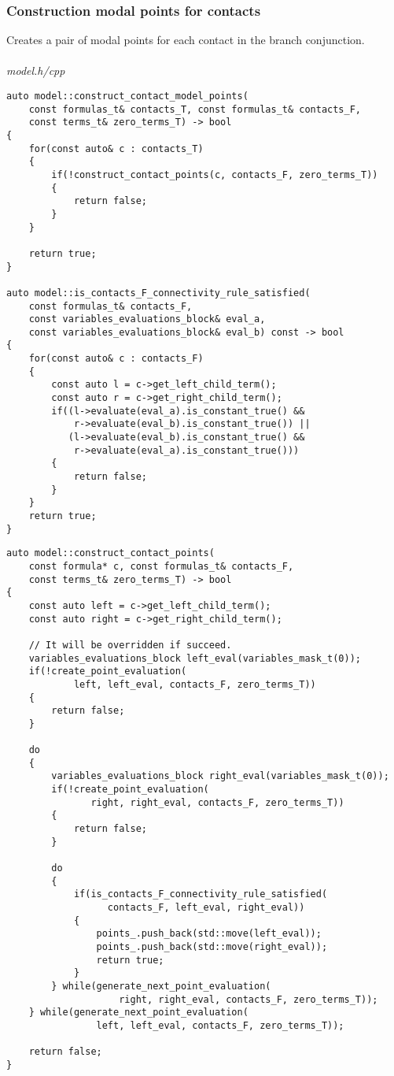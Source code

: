 \documentclass{article}
\begin{document}
	\subsubsection*{Construction modal points for contacts}
	Creates a pair of modal points for each contact in the branch conjunction.
\\
\\
\noindent
\textit{model.h/cpp}
\begin{lstlisting}
auto model::construct_contact_model_points(
	const formulas_t& contacts_T, const formulas_t& contacts_F,
	const terms_t& zero_terms_T) -> bool
{
    for(const auto& c : contacts_T)
    {
        if(!construct_contact_points(c, contacts_F, zero_terms_T))
        {
            return false;
        }
    }

    return true;
}

auto model::is_contacts_F_connectivity_rule_satisfied(
	const formulas_t& contacts_F,
	const variables_evaluations_block& eval_a,
	const variables_evaluations_block& eval_b) const -> bool
{
    for(const auto& c : contacts_F)
    {
        const auto l = c->get_left_child_term();
        const auto r = c->get_right_child_term();
        if((l->evaluate(eval_a).is_constant_true() &&
            r->evaluate(eval_b).is_constant_true()) ||
           (l->evaluate(eval_b).is_constant_true() &&
            r->evaluate(eval_a).is_constant_true()))
        {
            return false;
        }
    }
    return true;
}
\end{lstlisting}
\newpage
\begin{lstlisting}
auto model::construct_contact_points(
	const formula* c, const formulas_t& contacts_F,
	const terms_t& zero_terms_T) -> bool
{
    const auto left = c->get_left_child_term();
    const auto right = c->get_right_child_term();

    // It will be overridden if succeed.
    variables_evaluations_block left_eval(variables_mask_t(0));
    if(!create_point_evaluation(
            left, left_eval, contacts_F, zero_terms_T))
    {
        return false;
    }

    do
    {
        variables_evaluations_block right_eval(variables_mask_t(0));
        if(!create_point_evaluation(
               right, right_eval, contacts_F, zero_terms_T))
        {
            return false;
        }

        do
        {
            if(is_contacts_F_connectivity_rule_satisfied(
                  contacts_F, left_eval, right_eval))
            {
                points_.push_back(std::move(left_eval));
                points_.push_back(std::move(right_eval));
                return true;
            }
        } while(generate_next_point_evaluation(
                    right, right_eval, contacts_F, zero_terms_T));
    } while(generate_next_point_evaluation(
                left, left_eval, contacts_F, zero_terms_T));

    return false;
}
\end{lstlisting}
\end{document}
